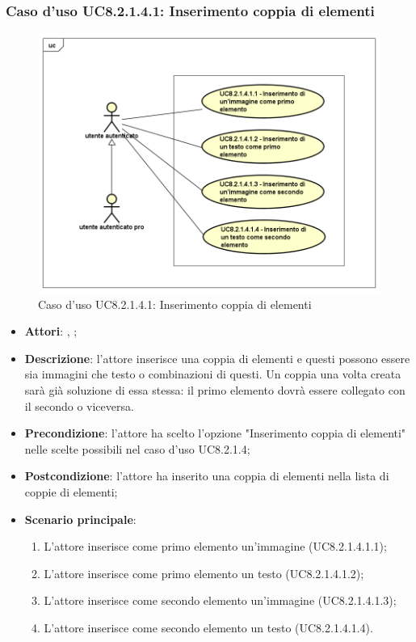 	\subsubsection{Caso d'uso UC8.2.1.4.1: Inserimento coppia di elementi}
	\label{UC8.2.1.4.1}
	\begin{figure}[h]
		\centering
		\includegraphics[scale=0.5,keepaspectratio]{UML/UC8_2_1_4_1.png}
		\caption{Caso d'uso UC8.2.1.4.1: Inserimento coppia di elementi}
	\end{figure}
	\FloatBarrier
	\begin{itemize}
		\item \textbf{Attori}: \uau, \uaupro;
		\item \textbf{Descrizione}: l'attore inserisce una coppia di elementi e questi possono essere sia immagini che testo o combinazioni di questi. Un coppia una volta creata sarà già soluzione di essa stessa: il primo elemento dovrà essere collegato con il secondo o viceversa. 
		\item \textbf{Precondizione}: l'attore ha scelto l'opzione "Inserimento coppia di elementi" nelle scelte possibili nel caso d'uso UC8.2.1.4;
		\item \textbf{Postcondizione}: l'attore ha inserito una coppia di elementi nella lista di coppie di elementi; 
		\item \textbf{Scenario principale}: 
		\begin{enumerate}
			\item L'attore inserisce come primo elemento un'immagine (UC8.2.1.4.1.1);
			\item L'attore inserisce come primo elemento un testo (UC8.2.1.4.1.2);
			\item L'attore inserisce come secondo elemento un'immagine (UC8.2.1.4.1.3);
			\item L'attore inserisce come secondo elemento un testo (UC8.2.1.4.1.4).	
		\end{enumerate}
	\end{itemize}
	
